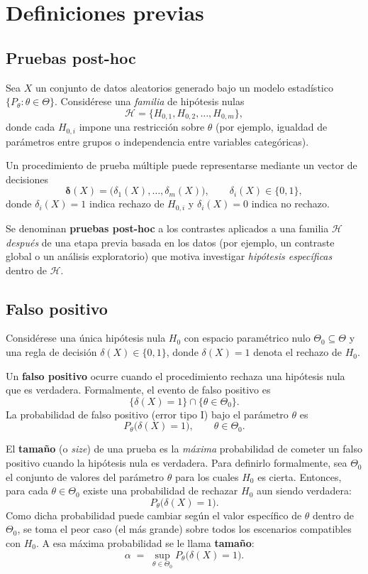 \section{Definiciones previas}

\subsection{Pruebas post-hoc}
Sea $X$ un conjunto de datos aleatorios generado bajo un modelo estadístico $\{P_\theta:\theta\in\Theta\}$. 
Considérese una \emph{familia} de hipótesis nulas
\[
\mathcal{H}=\{H_{0,1},H_{0,2},\dots,H_{0,m}\},
\]
donde cada $H_{0,i}$ impone una restricción sobre $\theta$ (por ejemplo, igualdad de parámetros entre grupos o independencia entre variables categóricas). 

Un procedimiento de prueba múltiple puede representarse mediante un vector de decisiones
\[
\boldsymbol{\delta}(X)=\big(\delta_1(X),\dots,\delta_m(X)\big), 
\qquad \delta_i(X)\in\{0,1\},
\]
donde $\delta_i(X)=1$ indica rechazo de $H_{0,i}$ y $\delta_i(X)=0$ indica no rechazo.

Se denominan \textbf{pruebas post-hoc} a los contrastes aplicados a una familia $\mathcal{H}$ \emph{después} de una etapa previa basada en los datos (por ejemplo, un contraste global o un análisis exploratorio) que motiva investigar \emph{hipótesis específicas} dentro de $\mathcal{H}$. 


\subsection{Falso positivo}
Considérese una única hipótesis nula $H_0$ con espacio paramétrico nulo $\Theta_0\subseteq\Theta$ y una regla de decisión $\delta(X)\in\{0,1\}$, donde $\delta(X)=1$ denota el rechazo de $H_0$.

Un \textbf{falso positivo} ocurre cuando el procedimiento rechaza una hipótesis nula que es verdadera. Formalmente, el evento de falso positivo es
\[
\{\delta(X)=1\}\cap\{\theta\in\Theta_0\}.
\]
La probabilidad de falso positivo (error tipo I) bajo el parámetro $\theta$ es
\[
P_\theta\big(\delta(X)=1\big), \qquad \theta\in\Theta_0.
\]

El \textbf{tamaño} (o \emph{size}) de una prueba es la \emph{máxima} probabilidad de cometer un falso positivo cuando la hipótesis nula es verdadera. Para definirlo formalmente, sea $\Theta_0$ el conjunto de valores del parámetro $\theta$ para los cuales $H_0$ es cierta. Entonces, para cada $\theta\in\Theta_0$ existe una probabilidad de rechazar $H_0$ aun siendo verdadera:
\[
P_\theta\big(\delta(X)=1\big).
\]
Como dicha probabilidad puede cambiar según el valor específico de $\theta$ dentro de $\Theta_0$, se toma el peor caso (el más grande) sobre todos los escenarios compatibles con $H_0$. A esa máxima probabilidad se le llama \textbf{tamaño}:
\[
\alpha \;=\;\sup_{\theta\in\Theta_0} P_\theta\big(\delta(X)=1\big).
\]

